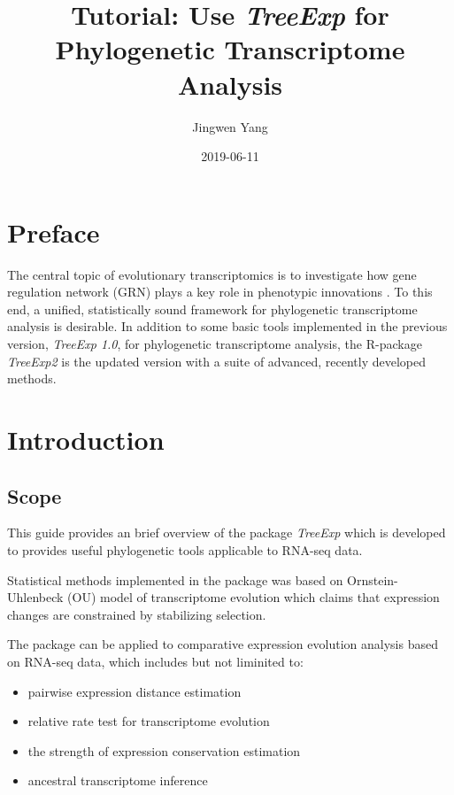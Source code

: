 \documentclass[]{book}
\title{Tutorial: Use \emph{TreeExp} for Phylogenetic Transcriptome Analysis}
\author{Jingwen Yang}
\date{2019-06-11}
\providecommand{\tightlist}{%
  \setlength{\itemsep}{0pt}\setlength{\parskip}{0pt}}
\begin{document}
\maketitle

{
\setcounter{tocdepth}{1}
\tableofcontents
}
\hypertarget{preface}{%
\chapter{Preface}\label{preface}}

The central topic of evolutionary transcriptomics is to investigate how gene regulation network (GRN) plays a key role in phenotypic innovations \citep[\citet{harrison2012}\citet{lehner2013}]{king1975}. To this end, a unified, statistically sound framework for phylogenetic transcriptome analysis is desirable. In addition to some basic tools implemented in the previous version, \emph{TreeExp 1.0}\citep{doi:10.1002/jez.b.22707}, for phylogenetic transcriptome analysis, the R-package \emph{TreeExp2} is the updated version with a suite of advanced, recently developed methods.

\hypertarget{introduction}{%
\chapter{Introduction}\label{introduction}}

\hypertarget{scope}{%
\section{Scope}\label{scope}}

This guide provides an brief overview of the package \emph{TreeExp} which is developed to provides useful phylogenetic tools applicable to RNA-seq data.

Statistical methods implemented in the package was based on Ornstein-Uhlenbeck (OU) model of transcriptome evolution which claims that expression changes are constrained by stabilizing selection.

The package can be applied to comparative expression evolution analysis based on RNA-seq data, which includes but not liminited to:

\begin{itemize}
\tightlist
\item
  pairwise expression distance estimation
\item
  relative rate test for transcriptome evolution
\item
  the strength of expression conservation estimation
\item
  ancestral transcriptome inference
\end{itemize}
\end{document}
